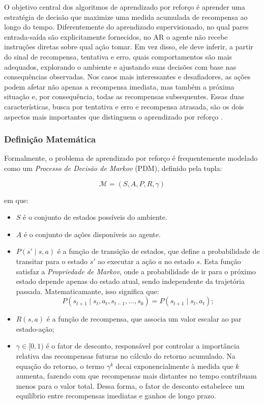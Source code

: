 O objetivo central dos algoritmos de aprendizado por reforço é aprender uma estratégia de decisão que maximize uma medida acumulada de recompensa ao longo do tempo. Diferentemente do aprendizado supervisionado, no qual pares entrada-saída são explicitamente fornecidos, no AR o agente não recebe instruções diretas sobre qual ação tomar. Em vez disso, ele deve inferir, a partir do sinal de recompensa, tentativa e erro, quais comportamentos são mais adequados, explorando o ambiente e ajustando suas decisões com base nas consequências observadas. Nos casos mais interessantes e desafiadores, as ações podem afetar não apenas a recompensa imediata, mas também a próxima situação e, por consequência, todas as recompensas subsequentes. Essas duas características, busca por tentativa e erro e recompensa atrasada, são os dois aspectos mais importantes que distinguem o aprendizado por reforço \cite{SuttonBarto2018}.

\subsubsection{Definição Matemática}

Formalmente, o problema de aprendizado por reforço é frequentemente modelado como um \textit{Processo de Decisão de Markov} (PDM), definido pela tupla:

$$
\mathcal{M} = (S, A, P, R, \gamma)
$$

\noindent em que:
\begin{itemize}
    \item $S$ é o conjunto de estados possíveis do ambiente.
    \item $A$ é o conjunto de ações disponíveis ao agente.
    \item $P(s' \mid s, a)$ é a função de transição de estados, que define a probabilidade de transitar para o estado $s'$ ao executar a ação $a$ no estado $s$. Esta função satisfaz a \textit{Propriedade de Markov}, onde a probabilidade de ir para o próximo estado depende apenas do estado atual, sendo independente da trajetória passada. Matematicamante, isso significa que:
    $$
    P(s_{t+1} \mid s_t, a_t, s_{t-1}, \dots, s_0) = P(s_{t+1} \mid s_t, a_t);
    $$
    \item $R(s, a)$ é a função de recompensa, que associa um valor escalar ao par estado-ação;
    \item $\gamma \in [0,1)$ é o fator de desconto, responsável por controlar a importância relativa das recompensas futuras no cálculo do retorno acumulado. Na equação do retorno, o termo $\gamma^k$ decai exponencialmente à medida que $k$ aumenta, fazendo com que recompensas mais distantes no tempo contribuam menos para o valor total. Dessa forma, o fator de desconto estabelece um equilíbrio entre recompensas imediatas e ganhos de longo prazo.
\end{itemize}

